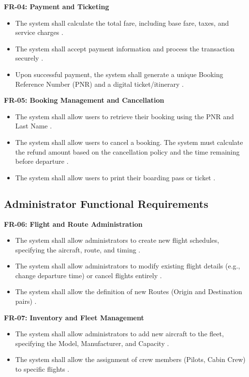 \documentclass[12pt, a4paper]{article}
\begin{document}
	\textbf{FR-04: Payment and Ticketing}
	\begin{itemize}
		\item The system shall calculate the total fare, including base fare, taxes, and service charges \cite{ref9}.
		\item The system shall accept payment information and process the transaction securely \cite{ref16}.
		\item Upon successful payment, the system shall generate a unique Booking Reference Number (PNR) and a digital ticket/itinerary \cite{ref32}.
	\end{itemize}
	
	\textbf{FR-05: Booking Management and Cancellation}
	\begin{itemize}
		\item The system shall allow users to retrieve their booking using the PNR and Last Name \cite{ref13}.
		\item The system shall allow users to cancel a booking. The system must calculate the refund amount based on the cancellation policy and the time remaining before departure \cite{ref26}.
		\item The system shall allow users to print their boarding pass or ticket \cite{ref10}.
	\end{itemize}
	
	\subsection{Administrator Functional Requirements}
	
	\textbf{FR-06: Flight and Route Administration}
	\begin{itemize}
		\item The system shall allow administrators to create new flight schedules, specifying the aircraft, route, and timing \cite{ref26}.
		\item The system shall allow administrators to modify existing flight details (e.g., change departure time) or cancel flights entirely \cite{ref20}.
		\item The system shall allow the definition of new Routes (Origin and Destination pairs) \cite{ref14}.
	\end{itemize}
	
	\textbf{FR-07: Inventory and Fleet Management}
	\begin{itemize}
		\item The system shall allow administrators to add new aircraft to the fleet, specifying the Model, Manufacturer, and Capacity \cite{ref14}.
		\item The system shall allow the assignment of crew members (Pilots, Cabin Crew) to specific flights \cite{ref20}.
	\end{itemize}
	
\end{document}
